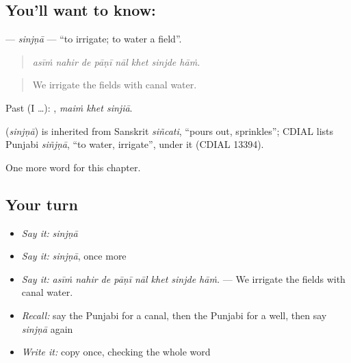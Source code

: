 \subsection*{You'll want to know: }
\textbf{} — \emph{sinjṇā} — \textquotedblleft{}to irrigate; to water a field\textquotedblright{}.

\begin{quote}
       
\end{quote}

\begin{quote}
\emph{asīṁ nahir de pāṇī nāl khet sinjde hāṁ.}
\end{quote}

\begin{quote}
We irrigate the fields with canal water.
\end{quote}

Past (I …):   , \emph{maiṁ khet sinjiā}.

\begin{cousinweb}
\textbf{} (\emph{sinjṇā}) is inherited from Sanskrit \emph{siñcati}, \textquotedblleft{}pours out, sprinkles\textquotedblright{}; CDIAL lists Punjabi \emph{siñjṇā}, \textquotedblleft{}to water, irrigate\textquotedblright{}, under it (CDIAL 13394).
\end{cousinweb}

\begin{grammarlens}[title={What you've built}]
One more word for this chapter.
\end{grammarlens}

\subsection*{Your turn}
\begin{itemize}
\raggedright
  \item \emph{Say it:} \emph{sinjṇā}
  \item \emph{Say it:} \emph{sinjṇā}, once more
  \item \emph{Say it:} \emph{asīṁ nahir de pāṇī nāl khet sinjde hāṁ.} — We irrigate the fields with canal water.
  \item \emph{Recall:} say the Punjabi for a canal, then the Punjabi for a well, then say \emph{sinjṇā} again
  \item \emph{Write it:} copy \textbf{} once, checking the whole word
\end{itemize}


